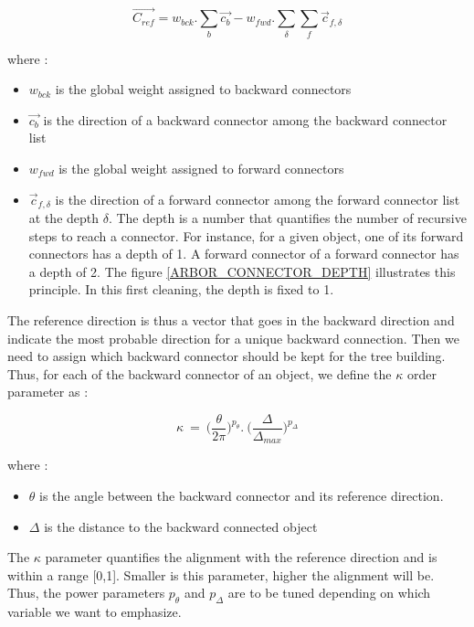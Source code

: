 \documentclass[cits]{JINST}
\begin{document}
\begin{equation}
  \vec{C_{ref}} = w_{bck} . \sum_b \vec{c_{b}} - w_{fwd} . \sum_\delta \sum_f \vec{c}_{f,\delta}
\end{equation}

where :

\begin{itemize}
  \item $w_{bck}$ is the global weight assigned to backward connectors
  \item $\vec{c_{b}}$ is the direction of a backward connector among the backward connector list
  \item $w_{fwd}$ is the global weight assigned to forward connectors
  \item $\vec{c}_{f,\delta}$ is the direction of a forward connector among the forward connector list at the depth $\delta$. The depth is a number that quantifies the number of recursive steps to reach a connector. For instance, for a given object, one of its forward connectors has a depth of 1. A forward connector of a forward connector has a depth of 2. The figure \ref{ARBOR_CONNECTOR_DEPTH} illustrates this principle. In this first cleaning, the depth is fixed to 1.
\end{itemize}

The reference direction is thus a vector that goes in the backward direction and indicate the most probable direction for a unique backward connection. Then we need to assign which backward connector should be kept for the tree building. Thus, for each of the backward connector of an object, we define the $\kappa$ order parameter as :

\begin{equation}
  \kappa~=~\Big(\frac{\theta}{2\pi}\Big)^{p_{\theta}} . ~\Big(\frac{\Delta}{\Delta_{max}}\Big)^{p_{\Delta}} 
\end{equation}

where :

\begin{itemize}
  \item $\theta$ is the angle between the backward connector and its reference direction.
  \item $\Delta$ is the distance to the backward connected object
\end{itemize}

The $\kappa$ parameter quantifies the alignment with the reference direction and is within a range [0,1]. Smaller is this parameter, higher the alignment will be. Thus, the power parameters $p_{\theta}$ and $p_{\Delta}$ are to be tuned depending on which variable we want to emphasize. 
\end{document}

